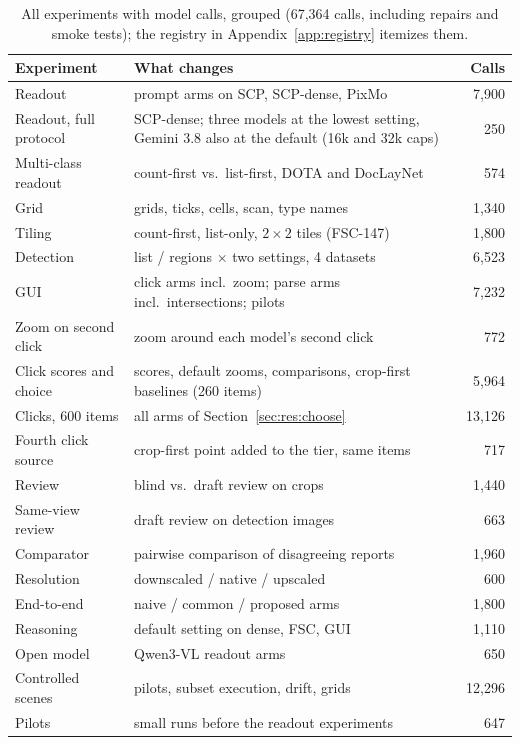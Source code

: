 \begin{table}[t]
\centering\small\setlength{\tabcolsep}{3pt}
\caption{All experiments with model calls, grouped (67,364 calls, including repairs and smoke tests); the registry in Appendix~\ref{app:registry} itemizes them.}\label{tab:experiments}
\begin{tabular}{@{}>{\raggedright\arraybackslash}p{1.75cm}>{\raggedright\arraybackslash}p{2.85cm}r@{}}\toprule
Experiment & What changes & Calls \\\midrule
Readout & 13 prompt arms on SCP, SCP-dense, PixMo & 7,900 \\
Readout, full protocol & SCP-dense; three models at the lowest setting, Gemini 3.8 also at the default (16k and 32k caps) & 250 \\
Multi-class readout & count-first vs.\ list-first, DOTA and DocLayNet & 574 \\
Grid & grids, ticks, cells, scan, type names & 1,340 \\
Tiling & count-first, list-only, $2\times2$ tiles (FSC-147) & 1,800 \\
Detection & list / regions $\times$ two settings, 4 datasets & 6,523 \\
GUI & click arms incl.\ zoom; parse arms incl.\ intersections; pilots & 7,232 \\
Zoom on second click & zoom around each model's second click & 772 \\
Click scores and choice & scores, default zooms, comparisons, crop-first baselines (260 items) & 5,964 \\
Clicks, 600 items & all arms of Section~\ref{sec:res:choose} & 13,126 \\
Fourth click source & crop-first point added to the tier, same items & 717 \\
Review & blind vs.\ draft review on crops & 1,440 \\
Same-view review & draft review on detection images & 663 \\
Comparator & pairwise comparison of disagreeing reports & 1,960 \\
Resolution & downscaled / native / upscaled & 600 \\
End-to-end & naive / common / proposed arms & 1,800 \\
Reasoning & default setting on dense, FSC, GUI & 1,110 \\
Open model & Qwen3-VL readout arms & 650 \\
Controlled scenes & pilots, subset execution, drift, grids & 12,296 \\
Pilots & small runs before the readout experiments & 647 \\\bottomrule
\end{tabular}
\end{table}

